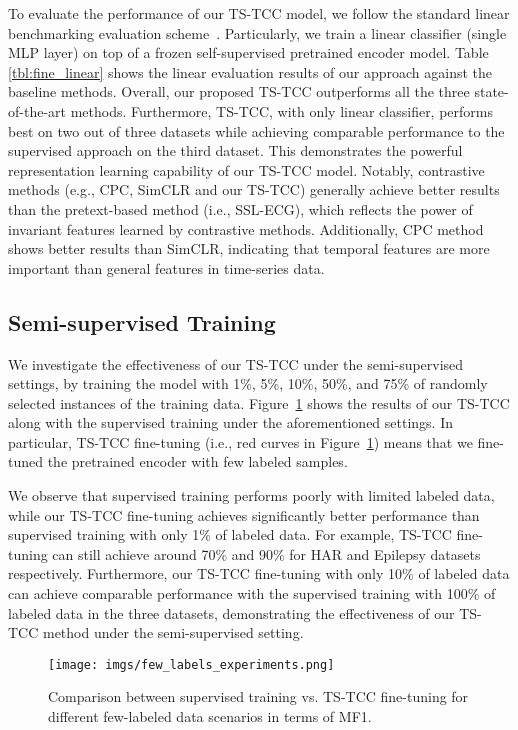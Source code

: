 \documentclass{article}
\begin{document}
To evaluate the performance of our TS-TCC model, we follow the standard linear benchmarking evaluation scheme~\cite{oord2018representation,chen2020simple}. Particularly,  we train a linear classifier (single MLP layer) on top of a frozen self-supervised pretrained encoder model. Table \ref{tbl:fine_linear} shows the linear evaluation results of our approach against the baseline methods. Overall, our proposed TS-TCC outperforms all the three state-of-the-art methods. Furthermore, TS-TCC, with only linear classifier, performs best on two out of three datasets while achieving comparable performance to the supervised approach on the third dataset. This demonstrates the powerful representation learning capability of our TS-TCC model. Notably, contrastive methods (e.g., CPC, SimCLR and our TS-TCC) generally achieve better results than the pretext-based method (i.e., SSL-ECG), which reflects the power of invariant features learned by contrastive methods. Additionally, CPC method shows better results than SimCLR, indicating that temporal features are more important than general features in time-series data. 




\subsection{Semi-supervised Training}
We investigate the effectiveness of our TS-TCC under the semi-supervised settings, by training the model with  1\%, 5\%, 10\%, 50\%, and 75\% of randomly selected instances of the training data.
Figure~\ref{Fig:few_labels} shows the results of our TS-TCC along with the supervised training under the aforementioned settings. In particular, TS-TCC fine-tuning (i.e., red curves in Figure~\ref{Fig:few_labels}) means that we fine-tuned the pretrained encoder with few labeled samples. 

We observe that supervised training performs poorly with limited labeled data, while our TS-TCC fine-tuning achieves significantly better performance than supervised training with only 1\% of labeled data. For example, TS-TCC fine-tuning can still achieve around 70\% and 90\% for HAR and Epilepsy datasets respectively. Furthermore, our TS-TCC fine-tuning with only 10\% of labeled data can achieve comparable performance with the supervised training with 100\% of labeled data in the three datasets, demonstrating the effectiveness of our TS-TCC method under the semi-supervised setting. 
\begin{figure}\centering
\texttt{[image: imgs/few\_labels\_experiments.png]}
\caption{Comparison between supervised training vs. TS-TCC fine-tuning for different few-labeled data scenarios in terms of MF1.}
\label{Fig:few_labels}
\end{figure}
\end{document}
